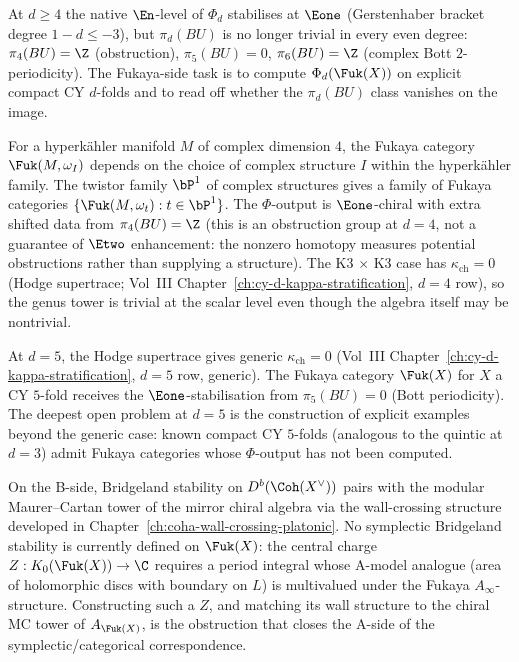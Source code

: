 At $d \geq 4$ the native $\En$-level of $\Phi_d$ stabilises at
$\Eone$ (Gerstenhaber bracket degree $1 - d \leq -3$), but
$\pi_d(BU)$ is no longer trivial in every even degree:
$\pi_4(BU) = \Z$ (obstruction), $\pi_5(BU) = 0$,
$\pi_6(BU) = \Z$ (complex Bott $2$-periodicity). The Fukaya-side
task is to compute $\Phi_d(\Fuk(X))$ on explicit compact CY $d$-folds
and to read off whether the $\pi_d(BU)$ class vanishes on the
image.

\begin{remark}[Hyperk\"{a}hler \texorpdfstring{$d = 4$}{d = 4}: HK Fukaya and \texorpdfstring{$\pi_4(BU)$}{pi-4(BU)}]
\label{rem:fukaya-d4-hk}
For a hyperk\"{a}hler manifold $M$ of complex dimension $4$, the
Fukaya category $\Fuk(M, \omega_I)$ depends on the choice of
complex structure $I$ within the hyperk\"{a}hler family. The
twistor family $\bP^1$ of complex structures gives a family of
Fukaya categories
$\{\Fuk(M, \omega_t) : t \in \bP^1\}$. The $\Phi$-output is
$\Eone$-chiral with extra shifted data from $\pi_4(BU) = \Z$
(this is an obstruction group at $d = 4$, not a guarantee of $\Etwo$
enhancement: the nonzero homotopy measures potential obstructions rather
than supplying a structure). The K3 $\times$ K3 case has
$\kappa_{\mathrm{ch}} = 0$ (Hodge supertrace; Vol~III
Chapter~\ref{ch:cy-d-kappa-stratification}, $d = 4$ row),
so the genus tower is trivial at the scalar level even though
the algebra itself may be nontrivial.
\end{remark}

\begin{remark}[CY \texorpdfstring{$d = 5$}{d = 5} Fukaya: Calabi--Yau or fake-Calabi--Yau?]
\label{rem:fukaya-d5}
At $d = 5$, the Hodge supertrace gives generic
$\kappa_{\mathrm{ch}} = 0$ (Vol~III Chapter~\ref{ch:cy-d-kappa-stratification},
$d = 5$ row, generic). The Fukaya category $\Fuk(X)$ for
$X$ a CY $5$-fold receives the $\Eone$-stabilisation from
$\pi_5(BU) = 0$ (Bott periodicity). The deepest open problem at
$d = 5$ is the construction of explicit examples beyond the
generic case: known compact CY $5$-folds (analogous to the
quintic at $d = 3$) admit Fukaya categories whose
$\Phi$-output has not been computed.
\end{remark}

\begin{remark}
\label{rem:fukaya-bridgeland-frontier}
On the B-side, Bridgeland stability on $D^b(\Coh(X^\vee))$
pairs with the modular Maurer--Cartan tower of the mirror chiral
algebra via the wall-crossing structure developed in
Chapter~\ref{ch:coha-wall-crossing-platonic}. No symplectic
Bridgeland stability is currently defined on $\Fuk(X)$: the
central charge $Z: K_0(\Fuk(X)) \to \C$ requires a period integral
whose A-model analogue (area of holomorphic discs with boundary on
$L$) is multivalued under the Fukaya $A_\infty$-structure.
Constructing such a $Z$, and matching its wall structure to the
chiral MC tower of $A_{\Fuk(X)}$, is the obstruction that closes
the A-side of the symplectic/categorical correspondence.
\end{remark}


